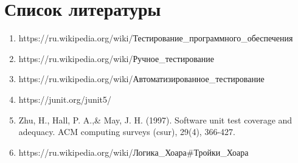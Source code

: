 \clearpage                                  %

\chapter*{Список литературы}          


\begin{enumerate}

\item https://ru.wikipedia.org/wiki/Тестирование_программного_обеспечения
	
\item https://ru.wikipedia.org/wiki/Ручное_тестирование

\item https://ru.wikipedia.org/wiki/Автоматизированное_тестирование

\item https://junit.org/junit5/

\item Zhu, H., Hall, P. A.,\& May, J. H. (1997). Software unit test coverage and adequacy. ACM computing surveys (csur), 29(4), 366-427.

\item https://ru.wikipedia.org/wiki/Логика_Хоара#Тройки_Хоара

\end{enumerate}


